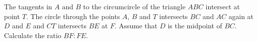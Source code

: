 The tangents in $A$ and $B$ to the circumcircle of the triangle $ABC$ intersect at point $T$.
The circle through the points $A$, $B$ and $T$ intersects $BC$ and $AC$ again
at $D$ and $E$ and $CT$ intersects $BE$ at $F$. Assume that $D$ is the midpoint of $BC$.
Calculate the ratio $BF:FE$. 

